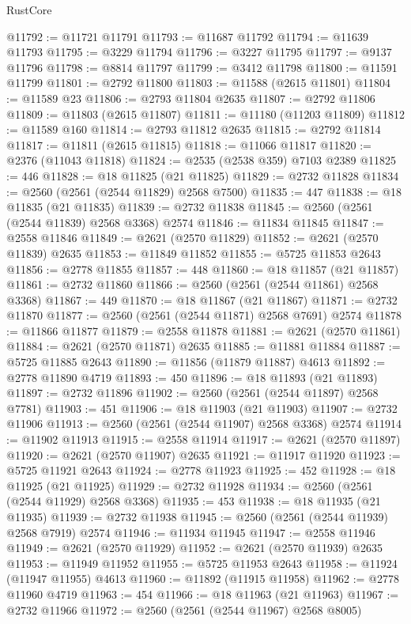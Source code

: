 \begin{lexlean}{RustCore}
\begin{coremodule}
@11792 := @11721 @11791
@11793 := @11687 @11792
@11794 := @11639 @11793
@11795 := @3229 @11794
@11796 := @3227 @11795
@11797 := @9137 @11796
@11798 := @8814 @11797
@11799 := @3412 @11798
@11800 := @11591 @11799
@11801 := @2792 @11800
@11803 := @11588 (@2615 @11801)
@11804 := @11589 @23
@11806 := @2793 @11804 @2635
@11807 := @2792 @11806
@11809 := @11803 (@2615 @11807)
@11811 := @11180 (@11203 @11809)
@11812 := @11589 @160
@11814 := @2793 @11812 @2635
@11815 := @2792 @11814
@11817 := @11811 (@2615 @11815)
@11818 := @11066 @11817
@11820 := @2376 (@11043 @11818)
@11824 := @2535 (@2538 @359) @7103 @2389
@11825 := 446
@11828 := @18 @11825 (@21 @11825)
@11829 := @2732 @11828
@11834 := @2560 (@2561 (@2544 @11829) @2568 @7500)
@11835 := 447
@11838 := @18 @11835 (@21 @11835)
@11839 := @2732 @11838
@11845 := @2560 (@2561 (@2544 @11839) @2568 @3368) @2574
@11846 := @11834 @11845
@11847 := @2558 @11846
@11849 := @2621 (@2570 @11829)
@11852 := @2621 (@2570 @11839) @2635
@11853 := @11849 @11852
@11855 := @5725 @11853 @2643
@11856 := @2778 @11855
@11857 := 448
@11860 := @18 @11857 (@21 @11857)
@11861 := @2732 @11860
@11866 := @2560 (@2561 (@2544 @11861) @2568 @3368)
@11867 := 449
@11870 := @18 @11867 (@21 @11867)
@11871 := @2732 @11870
@11877 := @2560 (@2561 (@2544 @11871) @2568 @7691) @2574
@11878 := @11866 @11877
@11879 := @2558 @11878
@11881 := @2621 (@2570 @11861)
@11884 := @2621 (@2570 @11871) @2635
@11885 := @11881 @11884
@11887 := @5725 @11885 @2643
@11890 := @11856 (@11879 @11887) @4613
@11892 := @2778 @11890 @4719
@11893 := 450
@11896 := @18 @11893 (@21 @11893)
@11897 := @2732 @11896
@11902 := @2560 (@2561 (@2544 @11897) @2568 @7781)
@11903 := 451
@11906 := @18 @11903 (@21 @11903)
@11907 := @2732 @11906
@11913 := @2560 (@2561 (@2544 @11907) @2568 @3368) @2574
@11914 := @11902 @11913
@11915 := @2558 @11914
@11917 := @2621 (@2570 @11897)
@11920 := @2621 (@2570 @11907) @2635
@11921 := @11917 @11920
@11923 := @5725 @11921 @2643
@11924 := @2778 @11923
@11925 := 452
@11928 := @18 @11925 (@21 @11925)
@11929 := @2732 @11928
@11934 := @2560 (@2561 (@2544 @11929) @2568 @3368)
@11935 := 453
@11938 := @18 @11935 (@21 @11935)
@11939 := @2732 @11938
@11945 := @2560 (@2561 (@2544 @11939) @2568 @7919) @2574
@11946 := @11934 @11945
@11947 := @2558 @11946
@11949 := @2621 (@2570 @11929)
@11952 := @2621 (@2570 @11939) @2635
@11953 := @11949 @11952
@11955 := @5725 @11953 @2643
@11958 := @11924 (@11947 @11955) @4613
@11960 := @11892 (@11915 @11958)
@11962 := @2778 @11960 @4719
@11963 := 454
@11966 := @18 @11963 (@21 @11963)
@11967 := @2732 @11966
@11972 := @2560 (@2561 (@2544 @11967) @2568 @8005)

\end{coremodule}
\end{lexlean}
